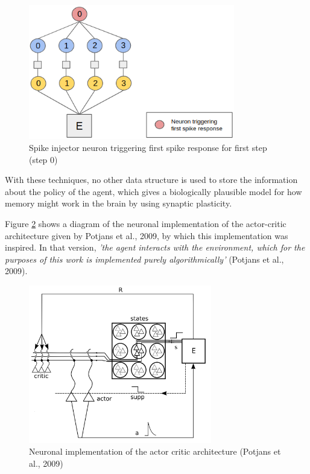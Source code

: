 \documentclass[10pt]{article}
\begin{document}
    \setcounter{figure}{5}

    \begin{figure}[ht!]
    \centering
    \includegraphics[width=90mm]{./firstSpike.png}
    \caption{Spike injector neuron triggering first spike response for first step (step 0) \label{overflow}}
    \label{fig:firstSpike}
    \end{figure}

    \setcounter{figure}{6}

    \newpage
    With these techniques, no other data structure is used to store the information about the policy of the agent, which gives a biologically plausible model for how memory might work in the brain by using synaptic plasticity.

    Figure \ref{fig:potjansImplementation} shows a diagram of the neuronal implementation of the actor-critic architecture given by Potjans et al., 2009, by which this implementation was inspired. In that version, \textit{'the agent interacts with the environment, which for the purposes of this work is implemented purely algorithmically'} (Potjans et al., 2009).

    \begin{figure}[ht!]
    \centering
    \includegraphics[width=80mm]{./implementation.png}
    \caption{Neuronal implementation of the actor critic architecture (Potjans et al., 2009)}
    \label{fig:potjansImplementation}
    \end{figure}
\end{document}
